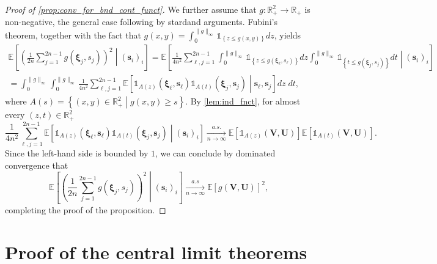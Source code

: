 \documentclass[11pt,a4paper,oneside]{article}
\theoremstyle{definition}
\theoremstyle{remark}
\def\E{\mathbb{E}}
\def\R{\mathbb{R}}
\begin{document}
\begin{proof}[Proof of \cref{prop:conv_for_bnd_cont_funct}]
We further assume that $g:\R^2_+\to\R_+$ is non-negative, the general case following by stardand arguments.
Fubini's theorem, together with the fact that $g(x,y)=\int_0^{\|g\|_\infty}\mathds{1}_{\left\{z\leq g(x,y)\right\}}dz$, yields
\begin{multline}
\E\left[\left(\frac{1}{2n}\sum_{j=1}^{2n-1}g\left(\bm \xi_j,s_j\right)\right)^2\middle| (\bm s_i)_i\right]
=\E\left[\frac{1}{4n^2}\sum_{\ell,j=1}^{2n-1}\int_0^{\|g\|_\infty}\mathds{1}_{\left\{z\leq g\left(\bm \xi_\ell,s_\ell\right)\right\}}dz \int_0^{\|g\|_\infty}\mathds{1}_{\left\{t\leq g\left(\bm \xi_j,s_j\right)\right\}}dt\middle| (\bm s_i)_i\right]\\
=\int_0^{\|g\|_\infty}\int_0^{\|g\|_\infty}\frac{1}{4n^2}\sum_{\ell,j=1}^{2n-1}\E\left[\mathds{1}_{A(z)}\left(\bm \xi_\ell,\bm s_\ell\right)\mathds{1}_{A(t)}\left(\bm \xi_j,\bm s_j\right)\middle| \bm s_\ell,\bm s_j\right]dz \; dt,
\end{multline}
where  $A(s)=\left\{(x,y)\in\R_+^2 \middle | g(x,y)\geq s \right\}$. 
By \cref{lem:ind_fnct}, for almost every $(z,t)\in\R^2_+$
\begin{equation}
\frac{1}{4n^2}\sum_{\ell,j=1}^{2n-1}\E\left[\mathds{1}_{A(z)}\left(\bm \xi_\ell,\bm s_\ell\right)\mathds{1}_{A(t)}\left(\bm \xi_j,\bm s_j\right)\middle| (\bm s_i)_i\right]\xrightarrow[n\to \infty]{a.s.} \E\left[\mathds{1}_{A(z)}\left(\bm V,\bm U\right)\right]\E\left[\mathds{1}_{A(t)}\left(\bm V,\bm U\right)\right].
\end{equation}
Since the left-hand side is bounded by $1$, we can conclude by dominated convergence that
\begin{equation}
\E\left[\left(\frac{1}{2n}\sum_{j=1}^{2n-1}g\left(\bm \xi_j,s_j\right)\right)^2\middle| (\bm s_i)_i\right]\xrightarrow[n\to \infty]{a.s}\E\left[g\left(\bm V,\bm U\right)\right]^2,
\end{equation} 
completing the proof of the proposition.
\end{proof}



\section{Proof of the central limit theorems}\label{sect:CLT}
\end{document}
